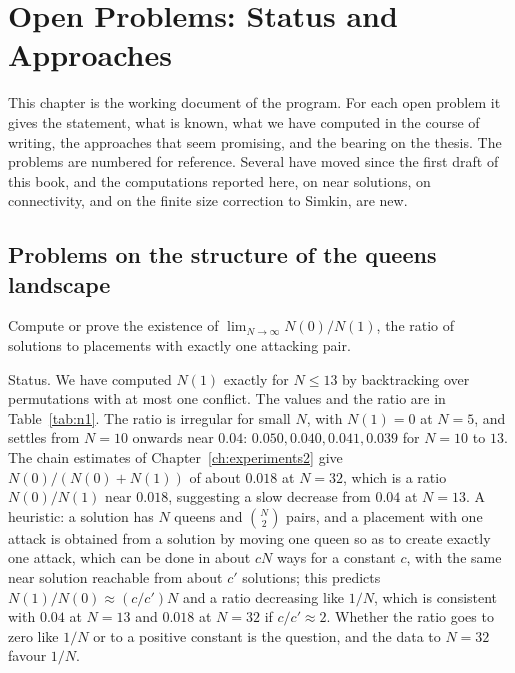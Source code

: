 \chapter{Open Problems: Status and Approaches}
\label{ch:open}

This chapter is the working document of the program. For each open problem it gives the statement, what is known, what we have computed in the course of writing, the approaches that seem promising, and the bearing on the thesis. The problems are numbered for reference. Several have moved since the first draft of this book, and the computations reported here, on near solutions, on connectivity, and on the finite size correction to Simkin, are new.

\section{Problems on the structure of the queens landscape}

\begin{problem}
Compute or prove the existence of $\lim_{N \to \infty} N(0) / N(1)$, the ratio of solutions to placements with exactly one attacking pair.
\end{problem}

Status. We have computed $N(1)$ exactly for $N \le 13$ by backtracking over permutations with at most one conflict. The values and the ratio are in Table~\ref{tab:n1}. The ratio is irregular for small $N$, with $N(1) = 0$ at $N = 5$, and settles from $N = 10$ onwards near $0.04$: $0.050, 0.040, 0.041, 0.039$ for $N = 10$ to $13$. The chain estimates of Chapter~\ref{ch:experiments2} give $N(0)/(N(0) + N(1))$ of about $0.018$ at $N = 32$, which is a ratio $N(0)/N(1)$ near $0.018$, suggesting a slow decrease from $0.04$ at $N = 13$. A heuristic: a solution has $N$ queens and $\binom{N}{2}$ pairs, and a placement with one attack is obtained from a solution by moving one queen so as to create exactly one attack, which can be done in about $cN$ ways for a constant $c$, with the same near solution reachable from about $c'$ solutions; this predicts $N(1) / N(0) \approx (c/c') N$ and a ratio decreasing like $1/N$, which is consistent with $0.04$ at $N = 13$ and $0.018$ at $N = 32$ if $c/c' \approx 2$. Whether the ratio goes to zero like $1/N$ or to a positive constant is the question, and the data to $N = 32$ favour $1/N$.

